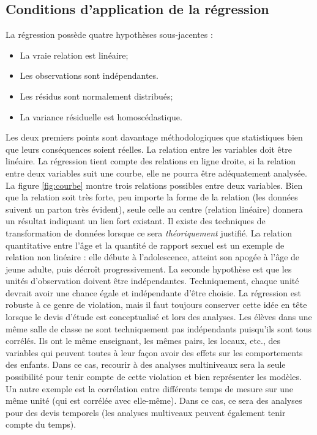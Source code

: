 \documentclass[
]{book}
\begin{document}
\hypertarget{conditions-dapplication-de-la-ruxe9gression}{%
\subsection{Conditions d'application de la régression}\label{conditions-dapplication-de-la-ruxe9gression}}

La régression possède quatre hypothèses sous-jacentes :

\begin{itemize}
\item
  La vraie relation est linéaire;
\item
  Les observations sont indépendantes.
\item
  Les résidus sont normalement distribués;
\item
  La variance résiduelle est homoscédastique.
\end{itemize}

Les deux premiers points sont davantage méthodologiques que statistiques bien que leurs conséquences soient réelles. La relation entre les variables doit être linéaire. La régression tient compte des relations en ligne droite, si la relation entre deux variables suit une courbe, elle ne pourra être adéquatement analysée. La figure \ref{fig:courbe} montre trois relations possibles entre deux variables. Bien que la relation soit très forte, peu importe la forme de la relation (les données suivent un parton très évident), seule celle au centre (relation linéaire) donnera un résultat indiquant un lien fort existant. Il existe des techniques de transformation de données lorsque ce sera \emph{théoriquement} justifié. La relation quantitative entre l'âge et la quantité de rapport sexuel est un exemple de relation non linéaire : elle débute à l'adolescence, atteint son apogée à l'âge de jeune adulte, puis décroît progressivement. La seconde hypothèse est que les unités d'observation doivent être indépendantes. Techniquement, chaque unité devrait avoir une chance égale et indépendante d'être choisie. La régression est robuste à ce genre de violation, mais il faut toujours conserver cette idée en tête lorsque le devis d'étude est conceptualisé et lors des analyses. Les élèves dans une même salle de classe ne sont techniquement pas indépendants puisqu'ils sont tous corrélés. Ils ont le même enseignant, les mêmes pairs, les locaux, etc., des variables qui peuvent toutes à leur façon avoir des effets sur les comportements des enfants. Dans ce cas, recourir à des analyses multiniveaux sera la seule possibilité pour tenir compte de cette violation et bien représenter les modèles. Un autre exemple est la corrélation entre différents temps de mesure sur une même unité (qui est corrélée avec elle-même). Dans ce cas, ce sera des analyses pour des devis temporels (les analyses multiveaux peuvent également tenir compte du temps).
\end{document}
